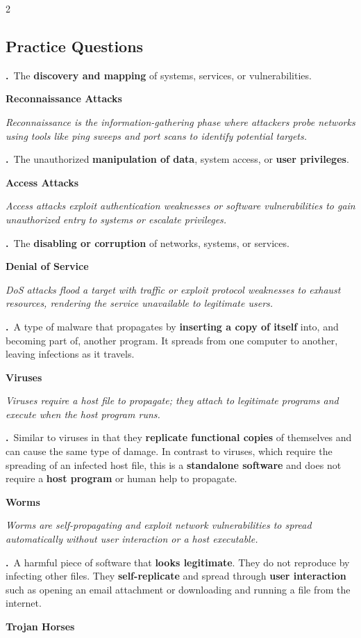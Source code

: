 \documentclass[9pt]{article}
\newcommand{\answer}[1]{%
  \par\nobreak\vspace{1pt}%
  \begin{tcolorbox}[
    colback=AnswerRed,
    colframe=AnswerRed,
    boxrule=0pt,
    arc=0pt,
    left=4pt, right=4pt,
    top=0.5pt, bottom=0.5pt,
    before skip=0pt,
    after skip=0pt
  ]
  {\footnotesize\bfseries\color{white}\RaggedRight #1}
  \end{tcolorbox}
}
\newcommand{\hl}[1]{\textbf{\textcolor{themeColor}{#1}}}
\newcommand{\explain}[1]{%
  \par\nobreak\vspace{0pt}%
  \begin{tcolorbox}[
    colback=LightBlueBg,
    colframe=SoftBlue!30,
    boxrule=0.3pt,
    arc=2pt,
    left=4pt, right=4pt,
    top=1pt, bottom=1pt,
    before skip=1pt,
    after skip=2pt
  ]
  {\footnotesize\color{MutedGray}\RaggedRight\itshape #1}
  \end{tcolorbox}
}
\newcounter{qnum}
\newcommand{\question}[1]{%
  \Needspace{4\baselineskip}%
  \stepcounter{qnum}%
  \par\vspace{3pt}%
  {\footnotesize\bfseries\color{themeColor}\theqnum.}\ {\footnotesize #1}%
}
\newcommand{\questioncolumns}[1]{%
  \begin{multicols}{2}
  \subsection*{Practice Questions}
  #1
  \end{multicols}
}
\begin{document}
\questioncolumns{
\question{The \hl{discovery and mapping} of systems, services, or vulnerabilities.}

\answer{Reconnaissance Attacks}

\explain{Reconnaissance is the information-gathering phase where attackers probe networks using tools like ping sweeps and port scans to identify potential targets.}


\question{The unauthorized \hl{manipulation of data}, system access, or \hl{user privileges}.}

\answer{Access Attacks}

\explain{Access attacks exploit authentication weaknesses or software vulnerabilities to gain unauthorized entry to systems or escalate privileges.}


\question{The \hl{disabling or corruption} of networks, systems, or services.}

\answer{Denial of Service}

\explain{DoS attacks flood a target with traffic or exploit protocol weaknesses to exhaust resources, rendering the service unavailable to legitimate users.}


\question{A type of malware that propagates by \hl{inserting a copy of itself} into, and becoming part of, another program. It spreads from one computer to another, leaving infections as it travels.}

\answer{Viruses}

\explain{Viruses require a host file to propagate; they attach to legitimate programs and execute when the host program runs.}


\question{Similar to viruses in that they \hl{replicate functional copies} of themselves and can cause the same type of damage. In contrast to viruses, which require the spreading of an infected host file, this is a \hl{standalone software} and does not require a \hl{host program} or human help to propagate.}

\answer{Worms}

\explain{Worms are self-propagating and exploit network vulnerabilities to spread automatically without user interaction or a host executable.}


\question{A harmful piece of software that \hl{looks legitimate}. They do not reproduce by infecting other files. They \hl{self-replicate} and spread through \hl{user interaction} such as opening an email attachment or downloading and running a file from the internet.}

\answer{Trojan Horses}

}
\end{document}
